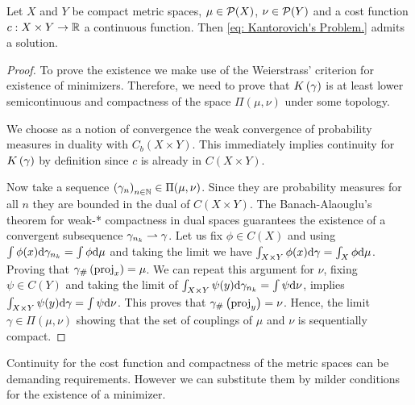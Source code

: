\begin{theorem} Let $X$ and $Y$ be compact metric spaces, $\mu \in \mathcal{P}(X)$, $\nu \in \mathcal{P}(Y)$ and a cost function $c: X\times Y \rightarrow \mathbb{R}$ a continuous function. Then \eqref{eq: Kantorovich's Problem.} admits a solution.
\end{theorem}
\begin{proof}
	To prove the existence we make use of the Weierstrass’ criterion for existence of minimizers. Therefore, we need to prove that $K\left(\gamma\right)$ is at least lower semicontinuous and compactness of the space $\Pi(\mu, \nu)$ under some topology. 
	
	We choose as a notion of convergence the weak convergence of probability measures in duality with $C_b(X\times Y)$. This immediately implies continuity for $K\left(\gamma\right)$ by definition since $c$ is already in $C(X\times Y)$. 
	
	Now take a sequence $\left( \gamma_n \right)_{n\in\mathbb{N}} \in \Pi(\mu, \nu)$. Since they are probability measures for all $n$ they are bounded in the dual of $C(X\times Y)$. The Banach-Alaouglu's theorem for weak-* compactness in dual spaces guarantees the existence of a convergent subsequence $\gamma_{n_k} \rightharpoonup \gamma$. Let us fix $\phi \in C(X)$ and using $\int\phi(x) \mathrm{d} \gamma_{n_k}=\int \phi \mathrm{d}\mu$ and taking the limit we have $\int_{X\times Y}\phi(x) \mathrm{d} \gamma=\int_{X} \phi \mathrm{d}\mu$. Proving that ${\gamma}_{\#} \left( \mathrm{proj}_x \right)=\mu$. We can repeat this argument for $\nu$, fixing $\psi \in C(Y)$ and taking the limit of $\int_{X\times Y} \psi(y) \mathrm{d} \gamma_{n_k}=\int \psi \mathrm{d}\nu$, implies $\int_{X\times Y} \psi(y) \mathrm{d} \gamma=\int \psi \mathrm{d}\nu$. This proves that ${\gamma}_{\#} \left( \mathrm{proj}_y \right)=\nu$. Hence, the limit $\gamma \in \Pi(\mu, \nu)$ showing that the set of couplings of $\mu$ and $\nu$ is sequentially compact. 
\end{proof}

Continuity for the cost function and compactness of the metric spaces can be demanding requirements. However we can substitute them by milder conditions for the existence of a minimizer. 


